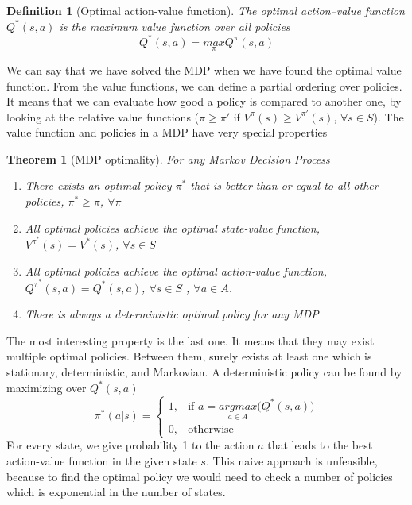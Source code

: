 \documentclass[main.tex]{subfiles}
\newtheorem{theorem}{Theorem}[section]
\newtheorem{definition}{Definition}[section]
\begin{document}
\begin{definition}[Optimal action-value function]
    The optimal action–value function $Q^*(s,a)$ is the maximum value function over all policies
    \begin{equation}
        Q^*(s,a) = \underset{\pi}{max} Q^{\pi}(s,a)
    \end{equation}
\end{definition}
We can say that we have solved the MDP when we have found the optimal value function. From the value functions, we can define a partial ordering over policies. It means that we can evaluate how good a policy is compared to another one, by looking at the relative value functions ($\pi \geq \pi'$ if $V^{\pi}(s) \geq V^{\pi'}(s)$, $\forall s \in S$).
The value function and policies in a MDP have very special properties
\begin{theorem}[MDP optimality]
    For any Markov Decision Process
    \begin{enumerate}
        \item There exists an optimal policy $\pi^*$ that is better than or equal to all other policies, $\pi^* \geq \pi$, $\forall \pi$
        \item All optimal policies achieve the optimal state-value function, $V^{\pi^*}(s) = V^*(s)$, $\forall s \in S$
        \item All optimal policies achieve the optimal action-value function, $Q^{\pi^*}(s,a) = Q^*(s,a)$, $\forall s \in S$ , $\forall a \in A$.
        \item There is always a deterministic optimal policy for any MDP
    \end{enumerate}
\end{theorem}
The most interesting property is the last one. It means that they may exist multiple optimal policies. Between them, surely exists at least one which is stationary, deterministic, and Markovian. A deterministic policy can be found by maximizing over $Q^*(s,a)$
\begin{equation}
    \pi^*(a|s) =
    \begin{cases}
        1, & \text{if } a = \underset{a \in A}{argmax} \big(Q^*(s,a)\big) \\
        0, & \text{otherwise}
    \end{cases}
\end{equation}
For every state, we give probability 1 to the action $a$ that leads to the best action-value function in the given state $s$. This naive approach is unfeasible, because to find the optimal policy we would need to check a number of policies which is exponential in the number of states.
\end{document}
